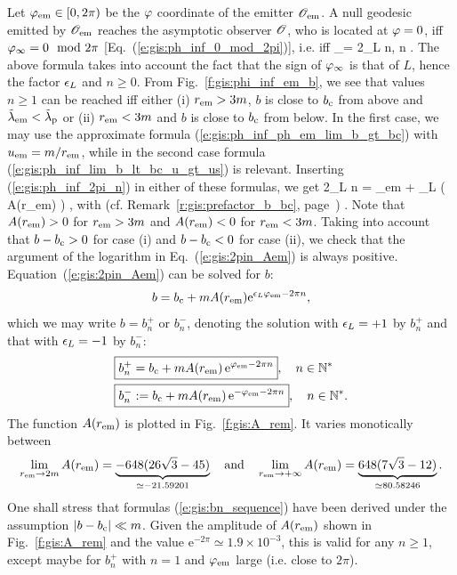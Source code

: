 Let $\varphi_{\rm em}\in {[0, 2\pi)}$ be the $\varphi$ coordinate of the emitter $\mathscr{O}_{\rm em}$.
A null geodesic emitted by $\mathscr{O}_{\rm em}$ reaches the asymptotic observer $\mathscr{O}$, who is located at $\varphi=0$, iff $\varphi_\infty = 0 \mod 2\pi$ [Eq.~(\ref{e:gis:ph_inf_0_mod_2pi})],
i.e. iff
\be \label{e:gis:ph_inf_2pi_n}
    \ph_\infty = 2\pi\eps_L n, \qquad n\in{} .
\ee
The above formula takes into account the fact that the sign of $\varphi_\infty$
is that of $L$, hence the factor $\epsilon_L$ and $n\geq 0$.
From Fig.~\ref{f:gis:phi_inf_em_b}, we see that values $n \geq 1$ can be
reached iff either (i) $r_{\rm em} > 3m$, $b$ is close to $b_{\rm c}$ from above and ${\tilde\lambda}_{\rm em} < {\tilde\lambda}_{\rm p}$ or (ii) $r_{\rm em} < 3m$ and $b$ is close to
$b_{\rm c}$ from below.
In the first case, we may use the approximate formula
(\ref{e:gis:ph_inf_ph_em_lim_b_gt_bc}) with $u_{\rm em} = m/r_{\rm em}$, while in the second
case formula (\ref{e:gis:ph_inf_lim_b_lt_bc_u_gt_us}) is relevant.
Inserting (\ref{e:gis:ph_inf_2pi_n}) in either of these formulas, we get
\be \label{e:gis:2pin_Aem}
     2\pi\eps_L n = \ph_{\rm em}
   + \eps_L \ln \left( A(r_{\rm em})   \right) ,
\ee
with (cf. Remark~\ref{r:gis:prefactor_b_bc}, page~\pageref{r:gis:prefactor_b_bc})
\be \label{e:gis:def_A_rem}
    .
\ee
Note that $A(r_{\rm em})  > 0$ for $r_{\rm em} > 3 m$ and
$A(r_{\rm em})  < 0$ for $r_{\rm em} < 3 m$. Taking into account
that $b - b_{\rm c} > 0$ for case (i) and $b - b_{\rm c} < 0$ for case (ii),
we check that
the argument of the logarithm in Eq.~(\ref{e:gis:2pin_Aem}) is always
positive.
Equation~(\ref{e:gis:2pin_Aem}) can be solved for $b$:
\[
    b = b_{\rm c} + m A(r_{\rm em})  \mathrm{e}^{\epsilon_L \varphi_{\rm em} - 2\pi n},
\]
which we may write $b = b_n^+$ or $b_n^-$, denoting the solution with $\epsilon_L=+1$ by $b_n^+$
and that with $\epsilon_L=-1$ by $b_n^-$:
\begin{subequations}
\label{e:gis:bn_sequence}
\begin{align}
& \fbox{$\displaystyle b_n^+ = b_{\rm c} + m A(r_{\rm em})\, \mathrm{e}^{\varphi_{\rm em} - 2\pi n}$},\quad
n\in \mathbb{N}^* \\
& \fbox{$\displaystyle b_n^- := b_{\rm c} + m A(r_{\rm em})\,  \mathrm{e}^{- \varphi_{\rm em} - 2\pi n}$},\quad
n\in \mathbb{N}^* .
\end{align}
\end{subequations}
The function $A(r_{\rm em})$ is plotted in Fig.~\ref{f:gis:A_rem}.
It varies monotically between
\[
\lim_{r_{\rm em}\to 2m} A(r_{\rm em}) = \underbrace{- 648(26\sqrt{3} - 45)}_{\simeq -21.59201}
\quad\mbox{and}\quad
\lim_{r_{\rm em}\to +\infty} A(r_{\rm em}) = \underbrace{648(7\sqrt{3} - 12)}_{\simeq 80.58246}.
\]
One shall stress that formulas (\ref{e:gis:bn_sequence}) have been derived
under the assumption $|b - b_{\rm c}| \ll m$. Given the amplitude of $A(r_{\rm em})$
shown in Fig.~\ref{f:gis:A_rem} and the value $\mathrm{e}^{-2\pi} \simeq 1.9\times 10^{-3}$,
this is valid for any $n\geq 1$, except maybe for $b_n^+$ with $n=1$ and $\varphi_{\rm em}$
large (i.e. close to $2\pi$).

